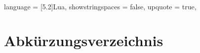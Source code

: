 






\usepackage{listings}
{
  language         = {[5.2]Lua},
  showstringspaces = false,
  upquote          = true,
}
\lstset{style=myLuastyle}


\newcommand{\titel}			{Übertragung der Entwurfsvorschrift III auf Lua}
\newcommand{\autor}			{Michael Bannas, Pascal Görgen, Marc Reineking, Timo Kluge, Matthias Sobek \& Jan Werder}
\newcommand{\zenturie}		{I12a}
\newcommand{\typ}			{Positionspapier}
\newcommand{\fachrichtung}	{Wirtschaftsinformatik}
\newcommand{\zeitraum}		{20.05.2014}
\newcommand{\gutachter}		{Johannes Brauer}









\frontmatter

\setcounter{page}{2}
\tableofcontents

\listoffigures
{}

 \listoftables
 
\chapter{Abkürzungsverzeichnis}


\mainmatter

